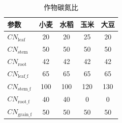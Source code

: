 \begin{table}[htbp]
  \centering
  \caption{作物碳氮比}
  \label{tab:作物碳氮比}
  \begin{tabular}{@{}lcccc@{}}
    \toprule
    参数                     & 小麦 & 水稻 & 玉米 & 大豆 \\ \midrule
    $CN_{\mathrm{leaf}}$     & 20   & 20   & 25   & 20   \\
    $CN_{\mathrm{stem}}$     & 50   & 50   & 50   & 50   \\
    $CN_{\mathrm{root}}$     & 42   & 42   & 42   & 42   \\
    $CN_{\mathrm{leaf\_f}}$  & 65   & 65   & 65   & 65   \\
    $CN_{\mathrm{stem\_f}}$  & 100  & 100  & 120  & 130  \\
    $CN_{\mathrm{root\_f}}$  & 40   & 40   & 0    & 0    \\
    $CN_{\mathrm{grain\_f}}$ & 50   & 50   & 50   & 50   \\ \bottomrule
  \end{tabular}
\end{table}

%

%


